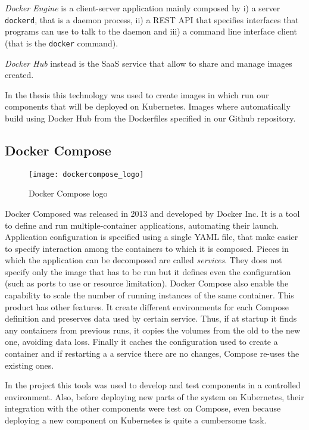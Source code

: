 \emph{Docker Engine} is a client-server application mainly composed by i) a
server \texttt{dockerd}, that is a daemon process, ii) a REST API that specifies
interfaces that programs can use to talk to the daemon and iii) a command line
interface client (that is the \texttt{docker} command).

\emph{Docker Hub} instead is the SaaS service that allow to share and manage
images created.

In the thesis this technology was used to create images in which run our
components that will be deployed on Kubernetes. Images where automatically build
using Docker Hub from the Dockerfiles specified in our Github repository.

\subsection{Docker Compose}
\begin{figure}[t]
  \centering \texttt{[image: dockercompose\_logo]}
  \caption{Docker Compose logo}
  \label{chap:intro:img:docker_logo}
\end{figure}
Docker Composed was released in 2013 and developed by Docker Inc. It is a tool
to define and run multiple-container applications, automating their launch.
Application configuration is specified using a single YAML file, that make
easier to specify interaction among the containers to which it is composed.
Pieces in which the application can be decomposed are called
\emph{services}. They does not specify only the image that has to be run but
it defines even the configuration (such as ports to use or resource limitation).
Docker Compose also enable the capability to scale the number of running
instances of the same container. This product has other features. It create
different environments for each Compose definition and preserves data used by 
certain service. Thus, if at startup it finds any containers from previous runs,
it copies the volumes from the old to the new one, avoiding data loss. Finally
it caches the configuration used to create a container and if restarting a a
service there are no changes, Compose re-uses the existing ones.

In the project this tools was used to develop and test components in a
controlled environment. Also, before deploying new parts of the system on
Kubernetes, their integration with the other components were test on Compose,
even because deploying a new component on Kubernetes is quite a cumbersome task.

